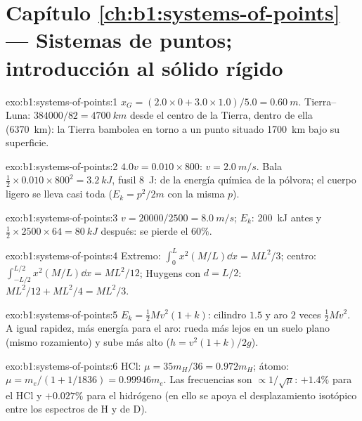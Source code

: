 \section*{Capítulo \ref{ch:b1:systems-of-points} --- Sistemas de puntos; introducción al sólido rígido}

\begin{solution}{exo:b1:systems-of-points:1}
$x_G = (2.0 \times 0 + 3.0 \times 1.0)/5.0 = \qty{0.60}{m}$. Tierra--Luna:
$384000/82 = \qty{4700}{km}$ desde el centro de la Tierra, dentro de ella
(\qty{6370}{km}): la Tierra bambolea en torno a un punto situado
\qty{1700}{km} bajo su superficie.
\end{solution}

\begin{solution}{exo:b1:systems-of-points:2}
$4.0v = 0.010 \times 800$: $v = \qty{2.0}{m/s}$. Bala $\tfrac12 \times 0.010
\times 800^2 = \qty{3.2}{kJ}$, fusil \qty{8}{J}: de la energía química de
la pólvora; el cuerpo ligero se lleva casi toda ($E_k = p^2/2m$ con la
misma $p$).
\end{solution}

\begin{solution}{exo:b1:systems-of-points:3}
$v = 20000/2500 = \qty{8.0}{m/s}$; $E_k$: \qty{200}{kJ} antes y $\tfrac12 \times
2500 \times 64 = \qty{80}{kJ}$ después: se pierde el $60\%$.
\end{solution}

\begin{solution}{exo:b1:systems-of-points:4}
Extremo: $\int_0^L x^2(M/L)\dd x = ML^2/3$; centro: $\int_{-L/2}^{L/2}x^2(M/L)
\dd x = ML^2/12$; Huygens con $d = L/2$: $ML^2/12 + ML^2/4 = ML^2/3$.
\end{solution}

\begin{solution}{exo:b1:systems-of-points:5}
$E_k = \tfrac12 Mv^2(1 + k)$: cilindro $1.5$ y aro $2$ veces $\tfrac12 Mv^2$.
A igual rapidez, más energía para el aro: rueda más lejos en un suelo
plano (mismo rozamiento) y sube más alto ($h = v^2(1 + k)/2g$).
\end{solution}

\begin{solution}{exo:b1:systems-of-points:6}
HCl: $\mu = 35m_H/36 = 0.972m_H$; átomo: $\mu = m_e/(1 + 1/1836) =
0.99946m_e$. Las frecuencias son $\propto 1/\sqrt\mu$: $+1.4\%$ para el HCl y
$+0.027\%$ para el hidrógeno (en ello se apoya el desplazamiento isotópico
entre los espectros de H y de D).
\end{solution}

